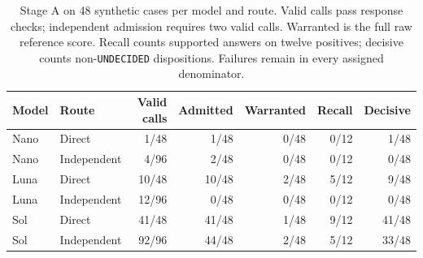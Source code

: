 \begin{table}[!htbp]
\centering
\small
\setlength{\tabcolsep}{3pt}
\caption{Stage A on 48 synthetic cases per model and route. Valid calls pass response checks; independent admission requires two valid calls. Warranted is the full raw reference score. Recall counts supported answers on twelve positives; decisive counts non-\texttt{UNDECIDED} dispositions. Failures remain in every assigned denominator.}
\label{tab:bias-stage-a}
\vspace{4pt}
\begin{tabular}{@{}llrrrrr@{}}
\toprule
Model & Route & Valid calls & Admitted & Warranted & Recall & Decisive\\
\midrule
Nano & Direct & 1/48 & 1/48 & 0/48 & 0/12 & 1/48\\
Nano & Independent & 4/96 & 2/48 & 0/48 & 0/12 & 0/48\\
Luna & Direct & 10/48 & 10/48 & 2/48 & 5/12 & 9/48\\
Luna & Independent & 12/96 & 0/48 & 0/48 & 0/12 & 0/48\\
Sol & Direct & 41/48 & 41/48 & 1/48 & 9/12 & 41/48\\
Sol & Independent & 92/96 & 44/48 & 2/48 & 5/12 & 33/48\\
\bottomrule
\end{tabular}
\end{table}
